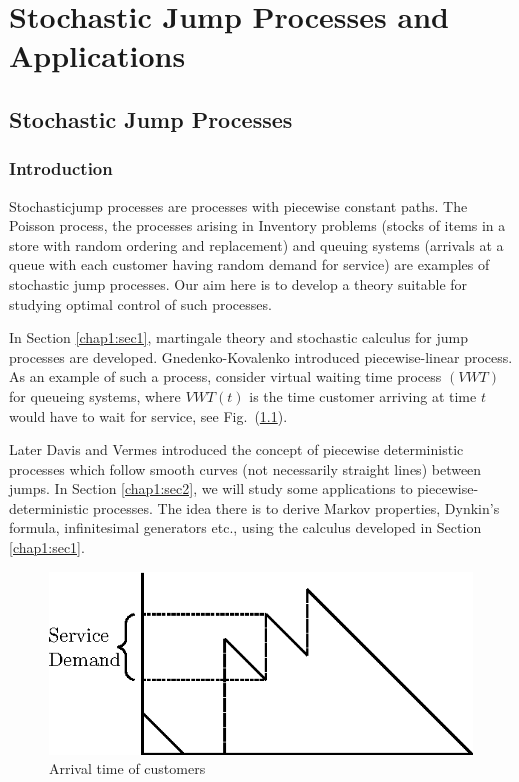 
\part{Stochastic Jump Processes and Applications} %

\chapter{Stochastic Jump Processes}\label{chap1}%


\setcounter{section}{-1}
\section{Introduction}%

Stochastic\pageoriginale jump processes  are processes  with piecewise
constant paths. The Poisson process, the processes  arising in
Inventory problems  (stocks of  items in a store with random  ordering
and replacement) and queuing  systems  (arrivals at a queue with each 
customer having  random demand for service) are examples of
stochastic jump processes. Our aim here is to develop a theory
suitable for studying optimal control of  such processes. 

In Section \ref{chap1:sec1}, martingale theory and stochastic calculus  for jump
processes are  developed. Gnedenko-Kovalenko \cite{key16} introduced
piecewise-linear process. As  an example of such a  process, consider
virtual waiting time process $(VWT)$  for queueing systems, where $VWT
(t)$   is the  time customer arriving  at time  $t$ would have to wait
for service, see Fig.~(\ref{chap1:fig1}). 

Later Davis \cite{key7} and  Vermes  \cite{key25} introduced the
concept of piecewise 
deterministic processes which follow smooth curves (not necessarily
straight lines) between jumps. In Section \ref{chap1:sec2}, we will study some
applications to piecewise-deterministic processes. The idea there is
to  derive Markov properties, Dynkin's formula, infinitesimal
generators etc., using the  calculus developed in Section \ref{chap1:sec1}. 

\begin{figure}[H]
\centering
\includegraphics{vol75-figures/fig1.eps}
\caption{Arrival time of customers}\label{chap1:fig1}
\end{figure} \pageoriginale

